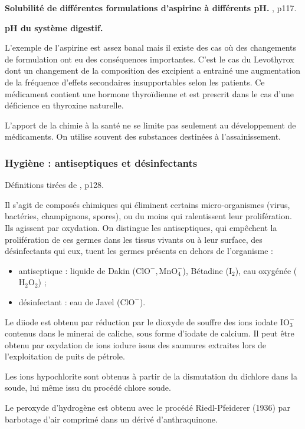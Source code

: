 \begin{experience}
\textbf{Solubilité de différentes formulations d'aspirine à différents pH.}
\cite{Bataille2010}, p117.
\end{experience}

\begin{slide}
\textbf{pH du système digestif.}
\end{slide}

L'exemple de l'aspirine est assez banal mais il existe des cas où des changements de formulation ont eu des conséquences importantes.
C'est le cas du Levothyrox \cite{Levothyrox} dont un changement de la composition des excipient a entrainé une augmentation de la fréquence d'effets secondaires insupportables selon les patients.
Ce médicament contient une hormone thyroïdienne et est prescrit dans le cas d'une déficience en thyroxine naturelle.

\begin{transition}
L'apport de la chimie à la santé ne se limite pas seulement au développement de médicaments.
On utilise souvent des substances destinées à l'assainissement.
\end{transition}

\subsubsection{Hygiène : antiseptiques et désinfectants}

Définitions tirées de \cite{Azan2011}, p128.

Il s'agit de composés chimiques qui éliminent certains micro-organismes (virus, bactéries, champignons, spores), ou du moins qui ralentissent leur prolifération.
Ils agissent par oxydation.
On distingue les antiseptiques, qui empêchent la prolifération de ces germes dans les tissus vivants ou à leur surface, des désinfectants qui eux, tuent les germes présents en dehors de l'organisme :
\begin{itemize}
\item antiseptique : liquide de Dakin ($\mathrm{ClO^-, MnO_4^-}$), Bétadine ($\mathrm{I_2}$), eau oxygénée ($\mathrm{H_2O_2}$) ;
\item désinfectant : eau de Javel ($\mathrm{ClO^-}$).
\end{itemize}

\begin{remarque}
Le diiode est obtenu par réduction par le dioxyde de souffre des ions iodate $\mathrm{IO_3^-}$ contenus dans le minerai de caliche, sous forme d'iodate de calcium.
Il peut être obtenu par oxydation de ions iodure issus des saumures extraites lors de l'exploitation de puits de pétrole.

\noindent
Les ions hypochlorite sont obtenus à partir de la dismutation du dichlore dans la soude, lui même issu du procédé chlore soude.

\noindent
Le peroxyde d'hydrogène est obtenu avec le procédé Riedl-Pfeiderer (1936) par barbotage d'air comprimé dans un dérivé d'anthraquinone.
\end{remarque}

